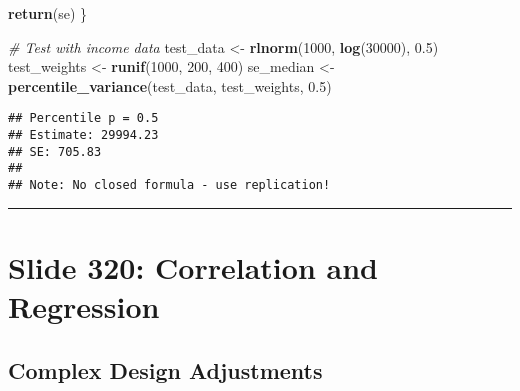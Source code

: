 \documentclass[
]{article}
\newenvironment{Shaded}{\begin{snugshade}}{\end{snugshade}}
\newcommand{\CommentTok}[1]{\textcolor[rgb]{0.56,0.35,0.01}{\textit{#1}}}
\newcommand{\DecValTok}[1]{\textcolor[rgb]{0.00,0.00,0.81}{#1}}
\newcommand{\FloatTok}[1]{\textcolor[rgb]{0.00,0.00,0.81}{#1}}
\newcommand{\FunctionTok}[1]{\textcolor[rgb]{0.13,0.29,0.53}{\textbf{#1}}}
\newcommand{\NormalTok}[1]{#1}
\newcommand{\OtherTok}[1]{\textcolor[rgb]{0.56,0.35,0.01}{#1}}
\begin{document}
\begin{Shaded}
\begin{Highlighting}[]
  \FunctionTok{return}\NormalTok{(se)}
\NormalTok{\}}

\CommentTok{\# Test with income data}
\NormalTok{test\_data }\OtherTok{\textless{}{-}} \FunctionTok{rlnorm}\NormalTok{(}\DecValTok{1000}\NormalTok{, }\FunctionTok{log}\NormalTok{(}\DecValTok{30000}\NormalTok{), }\FloatTok{0.5}\NormalTok{)}
\NormalTok{test\_weights }\OtherTok{\textless{}{-}} \FunctionTok{runif}\NormalTok{(}\DecValTok{1000}\NormalTok{, }\DecValTok{200}\NormalTok{, }\DecValTok{400}\NormalTok{)}
\NormalTok{se\_median }\OtherTok{\textless{}{-}} \FunctionTok{percentile\_variance}\NormalTok{(test\_data, test\_weights, }\FloatTok{0.5}\NormalTok{)}
\end{Highlighting}
\end{Shaded}

\begin{verbatim}
## Percentile p = 0.5 
## Estimate: 29994.23 
## SE: 705.83 
## 
## Note: No closed formula - use replication!
\end{verbatim}

\begin{center}\rule{0.5\linewidth}{0.5pt}\end{center}

\section{Slide 320: Correlation and
Regression}\label{slide-320-correlation-and-regression}

\subsection{Complex Design
Adjustments}\label{complex-design-adjustments}
\end{document}
